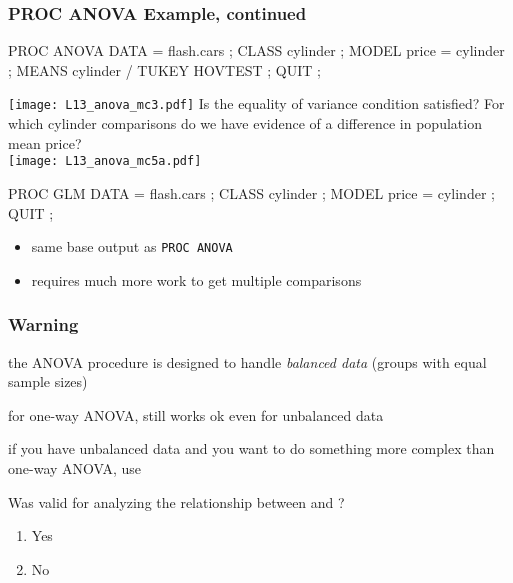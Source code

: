 \begin{frame}[fragile]
\frametitle{PROC ANOVA Example, continued}
\footnotesize
\begin{code}{.0}
PROC ANOVA DATA = flash.cars ;
   CLASS cylinder ;
   MODEL price = cylinder ;
   MEANS cylinder
   / TUKEY HOVTEST ;
QUIT ;
\end{code}
\vspace{2ex}
\texttt{[image: L13\_anova\_mc3.pdf]}
\emp
{} \hspace{1in} \emp
{}
\oyo Is the equality of variance condition satisfied?  For which cylinder comparisons do we have evidence of a difference in population mean price?\\
\vskip5pt
\texttt{[image: L13\_anova\_mc5a.pdf]}
\emp

\end{frame}

\begin{frame}[fragile]
\begin{code}{.0}
PROC GLM DATA = flash.cars ;
   CLASS cylinder ;
   MODEL price = cylinder ;
QUIT ;
\end{code}
\emp
{} \hspace{1in} \emp
{}
\begin{itemize}
\item same base output as \texttt{PROC ANOVA}
\item requires much more work to get multiple comparisons
\end{itemize}
\emp
\end{frame}

\begin{frame}
\frametitle{Warning}
\bi
\item  the ANOVA procedure is designed to handle \emph{balanced data} (groups with equal sample sizes)
\bi
\item for one-way ANOVA,  still works ok even for unbalanced data
\ei
\item if you have unbalanced data and you want to do something more complex than one-way ANOVA, use 
\ei
\vskip10pt
\begin{clicker}{Was  valid for analyzing the relationship between  and ?}
\begin{enumerate}
    \item Yes
    \item No
\end{enumerate}
\end{clicker}
\end{frame}


